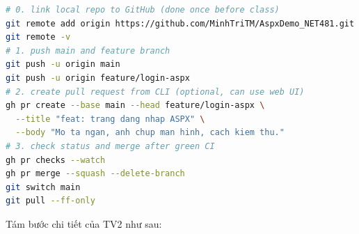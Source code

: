 \begin{lstlisting}[language=bash,caption={Đẩy code và tạo pull request trên GitHub},label={lst:phulucD-tv2-bash}]
# 0. link local repo to GitHub (done once before class)
git remote add origin https://github.com/MinhTriTM/AspxDemo_NET481.git
git remote -v
# 1. push main and feature branch
git push -u origin main
git push -u origin feature/login-aspx
# 2. create pull request from CLI (optional, can use web UI)
gh pr create --base main --head feature/login-aspx \
  --title "feat: trang dang nhap ASPX" \
  --body "Mo ta ngan, anh chup man hinh, cach kiem thu."
# 3. check status and merge after green CI
gh pr checks --watch
gh pr merge --squash --delete-branch
git switch main
git pull --ff-only
\end{lstlisting}

Tám bước chi tiết của TV2 như sau:

